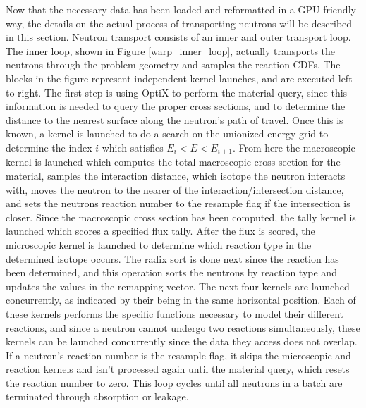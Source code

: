 Now that the necessary data has been loaded and reformatted in a GPU-friendly way, the details on the actual process of transporting neutrons will be described in this section.  Neutron transport consists of an inner and outer transport loop.  The inner loop, shown in Figure \ref{warp_inner_loop}, actually transports the neutrons through the problem geometry and samples the reaction CDFs.  The blocks in the figure represent independent kernel launches, and are executed left-to-right.  The first step is using OptiX to perform the material query, since this information is needed to query the proper cross sections, and to determine the distance to the nearest surface along the neutron's path of travel.  Once this is known, a kernel is launched to do a search on the unionized energy grid to determine the index $i$ which satisfies $E_i<E<E_{i+1}$.  From here the macroscopic kernel is launched which computes the total macroscopic cross section for the material, samples the interaction distance, which isotope the neutron interacts with, moves the neutron to the nearer of the interaction/intersection distance, and sets the neutrons reaction number to the resample flag if the intersection is closer.  Since the macroscopic cross section has been computed, the tally kernel is launched which scores a specified flux tally.  After the flux is scored, the microscopic kernel is launched to determine which reaction type in the determined isotope occurs.  The radix sort is done next since the reaction has been determined, and this operation sorts the neutrons by reaction type and updates the values in the remapping vector.  The next four kernels are launched concurrently, as indicated by their being in the same horizontal position.  Each of these kernels performs the specific functions necessary to model their different reactions, and since a neutron cannot undergo two reactions simultaneously, these kernels can be launched concurrently since the data they access does not overlap.  If a neutron's reaction number is the resample flag, it skips the microscopic and reaction kernels and isn't processed again until the material query, which resets the reaction number to zero.   This loop cycles until all neutrons in a batch are terminated through absorption or leakage.  

